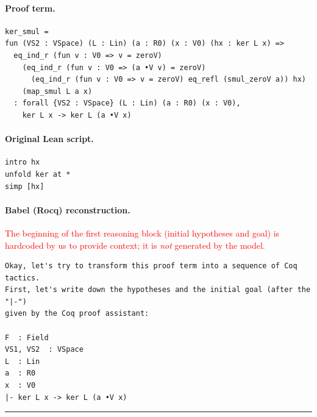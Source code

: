\documentclass{article}
\begin{document}
\paragraph{Proof term.}
\begin{verbatim}
ker_smul =
fun (VS2 : VSpace) (L : Lin) (a : R0) (x : V0) (hx : ker L x) =>
  eq_ind_r (fun v : V0 => v = zeroV)
    (eq_ind_r (fun v : V0 => (a •V v) = zeroV)
      (eq_ind_r (fun v : V0 => v = zeroV) eq_refl (smul_zeroV a)) hx)
    (map_smul L a x)
  : forall {VS2 : VSpace} (L : Lin) (a : R0) (x : V0),
    ker L x -> ker L (a •V x)
\end{verbatim}

\paragraph{Original Lean script.}
\begin{verbatim}
intro hx
unfold ker at *
simp [hx]
\end{verbatim}


\paragraph{Babel (Rocq) reconstruction.}

\noindent\textcolor{red}{The beginning of the first reasoning block (initial hypotheses and goal) is hardcoded by us to provide context; it is \emph{not} generated by the model.}

\begin{verbatim}
Okay, let's try to transform this proof term into a sequence of Coq tactics.
First, let's write down the hypotheses and the initial goal (after the "|-") 
given by the Coq proof assistant:

F  : Field
VS1, VS2  : VSpace
L  : Lin
a  : R0
x  : V0
|- ker L x -> ker L (a •V x)
\end{verbatim}

\noindent\rule{6cm}{0.4pt}
\end{document}
